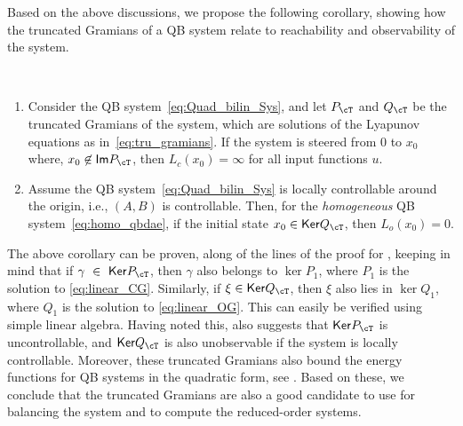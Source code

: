  Based on the above discussions, we propose the following corollary, showing how the truncated Gramians of a QB system relate to reachability and observability of the system.
\begin{corollary}\label{coro:gram_trc_re}
\	\begin{enumerate}[label=(\alph*)]
		\item  Consider the QB system~\eqref{eq:Quad_bilin_Sys}, and let $P_\cT$ and $Q_\cT $ be the truncated Gramians of the system, which are solutions of the Lyapunov equations as in~\eqref{eq:tru_gramians}. If the system is steered from $0$ to $x_0$ where, $x_0 \not\in \im P_\cT$, then $L_c(x_0) = \infty$ for all input functions $u$. 
		\item Assume the QB system~\eqref{eq:Quad_bilin_Sys} is locally controllable around the origin, i.e., $(A,B)$ is controllable.  Then, for  the \emph{homogeneous} QB system~\eqref{eq:homo_qbdae}, if  the initial state $x_0 \in  \ker Q_\cT$, then $L_o(x_0) = 0$.
\end{enumerate}
\end{corollary}
The above corollary can be proven, along of the lines of the proof for , keeping in mind that if $\gamma~\in~\ker P_\cT$, then $\gamma$ also belongs  to $\ker P_1$, where $P_1$ is the solution to \eqref{eq:linear_CG}. Similarly, if $\xi\in \ker Q_\cT $, then $\xi$ also lies in $\ker Q_1$, where $Q_1$ is the solution to \eqref{eq:linear_OG}. This can easily be verified using simple linear algebra. Having noted this,  also suggests that $\ker P_\cT$ is uncontrollable, and $\ker Q_\cT$ is also unobservable if the system is locally controllable.   Moreover, these truncated Gramians also bound the energy functions for QB systems in the quadratic form, see . Based on these, we conclude that the truncated Gramians are also a good candidate to use for balancing the system and to compute  the reduced-order systems. 


